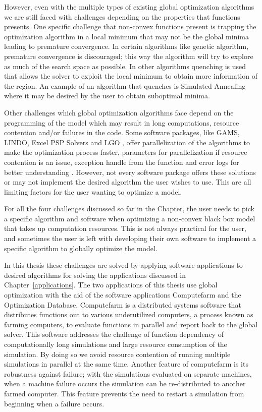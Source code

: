 However, even with the multiple types of existing global optimization algorithms we are still faced with challenges depending on the properties that functions presents. One specific challenge that non-convex functions present is trapping the optimization algorithm in a local minimum that may not be the global minima leading to premature convergence. In certain algorithms like genetic algorithm, premature convergence is discouraged; this way the algorithm will try to explore as much of the
search space as possible. In other algorithms quenching is used that allows the solver to exploit the local minimum to obtain more information of the region. An example of an algorithm that quenches is Simulated Annealing \cite{Aguiar} where it may be desired by the user to obtain suboptimal minima.   

Other challenges which global optimization algorithms face depend on the programming of the model which may result in long computations, resource contention and/or failures in the code. Some software packages, like GAMS, LINDO, Excel PSP Solvers and LGO \cite{Pinter2002}, offer parallelization of the algorithms \cite{Liberti2000} to make the optimization process
faster, parameters for parallelization if resource contention is an issue, exception handle from the function and error logs for better understanding \cite{Pinter2002}. However, not every software package offers these solutions or may not implement the desired algorithm the user wishes to use. This are all limiting factors for the user wanting to optimize a model. 

For all the four challenges discussed so far in the Chapter, the user needs to pick a specific algorithm and software when optimizing a non-convex black box model that takes up computation resources. This is not always practical for the user, and sometimes the user is left with developing their own software to implement a specific algorithm to globally optimize the model. 

In this thesis these challenges are solved by applying software applications to desired algorithms for solving the applications discussed in Chapter~\ref{applications}. The two applications of this thesis use global optimization with the aid of the software applications Computefarm and the Optimization Database. 
Computefarm is a distributed systems software that distributes functions out to various underutilized computers, a process known as farming computers, to evaluate functions in parallel and report back to the global solver. This software addresses the challenge of function dependency of computationally long simulations and large resource consumption of the simulation. By doing so we avoid resource contention of running multiple simulations in parallel at the same time. Another feature of
computefarm is its robustness against failure; with the simulations evaluated on separate machines, when a machine failure occurs the simulation can be re-distributed to another farmed computer. This feature prevents the need to restart a simulation from beginning when a failure occurs. 

